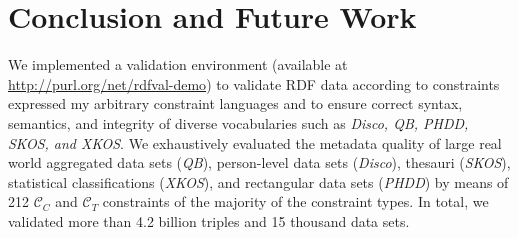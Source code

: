 \documentclass{llncs}
\begin{document}
\section{Conclusion and Future Work}

We implemented a validation environment (available at \url{http://purl.org/net/rdfval-demo}) to validate RDF data according to constraints expressed my arbitrary constraint languages and to ensure correct syntax, semantics, and integrity of diverse vocabularies such as \emph{Disco, QB, PHDD, SKOS, and XKOS}.
We exhaustively evaluated the metadata quality of large real world aggregated data sets (\emph{QB}), person-level data sets (\emph{Disco}), thesauri (\emph{SKOS}), statistical classifications (\emph{XKOS}), and rectangular data sets (\emph{PHDD}) by means of 212 $\mathcal{C}_{C}$ and $\mathcal{C}_{T}$ constraints of the majority of the constraint types.
In total, we validated more than 4.2 billion triples and 15 thousand data sets.

{}

\setcounter{tocdepth}{1}
\end{document}
